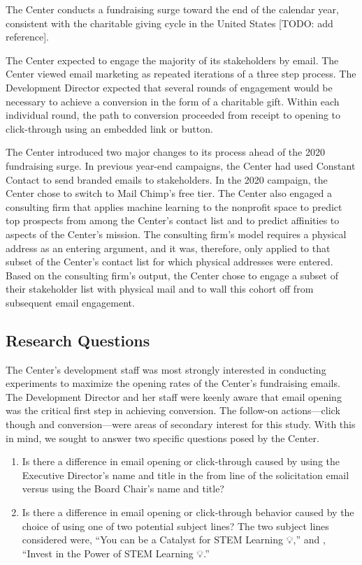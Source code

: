 \documentclass[]{article}
\begin{document}
The Center conducts a fundraising surge toward the end of the calendar
year, consistent with the charitable giving cycle in the United States
{[}TODO: add reference{]}.

The Center expected to engage the majority of its stakeholders by email.
The Center viewed email marketing as repeated iterations of a three step
process. The Development Director expected that several rounds of
engagement would be necessary to achieve a conversion in the form of a
charitable gift. Within each individual round, the path to conversion
proceeded from receipt to opening to click-through using an embedded
link or button.

The Center introduced two major changes to its process ahead of the 2020
fundraising surge. In previous year-end campaigns, the Center had used
Constant Contact to send branded emails to stakeholders. In the 2020
campaign, the Center chose to switch to Mail Chimp's free tier. The
Center also engaged a consulting firm that applies machine learning to
the nonprofit space to predict top prospects from among the Center's
contact list and to predict affinities to aspects of the Center's
mission. The consulting firm's model requires a physical address as an
entering argument, and it was, therefore, only applied to that subset of
the Center's contact list for which physical addresses were entered.
Based on the consulting firm's output, the Center chose to engage a
subset of their stakeholder list with physical mail and to wall this
cohort off from subsequent email engagement.

\subsection{Research Questions}\label{research-questions}

The Center's development staff was most strongly interested in
conducting experiments to maximize the opening rates of the Center's
fundraising emails. The Development Director and her staff were keenly
aware that email opening was the critical first step in achieving
conversion. The follow-on actions---click though and conversion---were
areas of secondary interest for this study. With this in mind, we sought
to answer two specific questions posed by the Center.

\begin{enumerate}
\def\labelenumi{\arabic{enumi}.}
\item
  Is there a difference in email opening or click-through caused by
  using the Executive Director's name and title in the from line of the
  solicitation email versus using the Board Chair's name and title?
\item
  Is there a difference in email opening or click-through behavior
  caused by the choice of using one of two potential subject lines? The
  two subject lines considered were, ``You can be a Catalyst for STEM
  Learning 💡,'' and , ``Invest in the Power of STEM Learning 💡.''
\end{enumerate}
\end{document}
